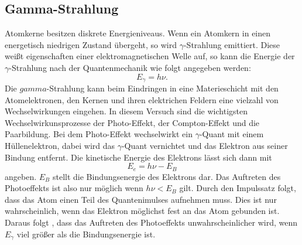 \subsection{Gamma-Strahlung}
Atomkerne besitzen diskrete Energieniveaus.
Wenn ein Atomkern in einen energetisch niedrigen Zustand übergeht, so wird $\gamma$-Strahlung emittiert.
Diese weißt eigenschaften einer elektromagnetischen Welle auf, so kann die Energie der $\gamma$-Strahlung
nach der Quantenmechanik wie folgt angegeben werden:
\begin{equation}
  E_\gamma = h\nu  .
\end{equation}
Die $gamma$-Strahlung kann beim Eindringen in eine Materieschicht mit den Atomelektronen, den Kernen und ihren elektrichen Feldern eine vielzahl von Wechselwirkungen eingehen.
In diesem Versuch sind die wichtigsten Wechselwirkunsprozesse der Photo-Effekt, der Compton-Effekt und die Paarbildung.
Bei dem Photo-Effekt wechselwirkt ein $\gamma$-Quant mit einem Hüllenelektron, dabei wird das $\gamma$-Quant vernichtet und das Elektron aus seiner Bindung entfernt.
Die kinetische Energie des Elektrons lässt sich dann mit
\begin{equation}
  E_e = h\nu - E_B
\end{equation}
angeben.
$E_B$ stellt die Bindungsenergie des Elektrons dar.
Das Auftreten des Photoeffekts ist also nur möglich wenn $h\nu < E_B$ gilt.
Durch den Impulssatz folgt, dass das Atom einen Teil des Quantenimulses aufnehmen muss.
Dies ist nur wahrscheinlich, wenn das Elektron möglichst fest an das Atom gebunden ist.
Daraus folgt , dass das Auftreten des Photoeffekts unwahrscheinlicher wird, wenn $E_\gamma$  viel größer als die Bindungsenergie ist.

